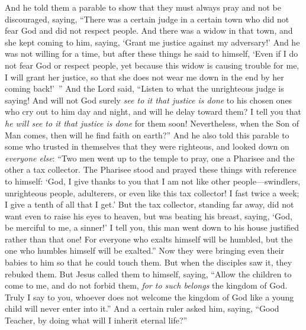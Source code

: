 \begin{biblechapter} %
 And he told them a parable to show that they must always pray and not be discouraged,
\verse saying, “There was a certain judge in a certain town who did not fear God and did not respect people.
\verse And there was a widow in that town, and she kept coming to him, saying, ‘Grant me justice against my adversary!’
\verse And he was not willing for a time, but after these things he said to himself, ‘Even if I do not fear God or respect people,
\verse yet because this widow is causing trouble for me, I will grant her justice, so that she does not wear me down in the end by her coming back!’ ”
\verse And the Lord said, “Listen to what the unrighteous judge is saying!
\verse And will not God surely \textit{see to it that justice is done} to his chosen ones who cry out to him day and night, and will he delay toward them?
\verse I tell you that \textit{he will see to it that justice is done} for them soon! Nevertheless, when the Son of Man comes, then will he find faith on earth?”
 And he also told this parable to some who trusted in themselves that they were righteous, and looked down on \textit{everyone else}:
\verse “Two men went up to the temple to pray, one a Pharisee and the other a tax collector.
\verse The Pharisee stood and prayed these things with reference to himself: ‘God, I give thanks to you that I am not like other people—swindlers, unrighteous people, adulterers, or even like this tax collector!
\verse I fast twice a week; I give a tenth of all that I get.’
\verse But the tax collector, standing far away, did not want even to raise his eyes to heaven, but was beating his breast, saying, ‘God, be merciful to me, a sinner!’
\verse I tell you, this man went down to his house justified rather than that one! For everyone who exalts himself will be humbled, but the one who humbles himself will be exalted.”
 Now they were bringing even their babies to him so that he could touch them. But when the disciples saw it, they rebuked them.
\verse But Jesus called them to himself, saying, “Allow the children to come to me, and do not forbid them, \textit{for to such belongs} the kingdom of God.
\verse Truly I say to you, whoever does not welcome the kingdom of God like a young child will never enter into it.”
 And a certain ruler asked him, saying, “Good Teacher, by doing what will I inherit eternal life?”

\end{biblechapter}
